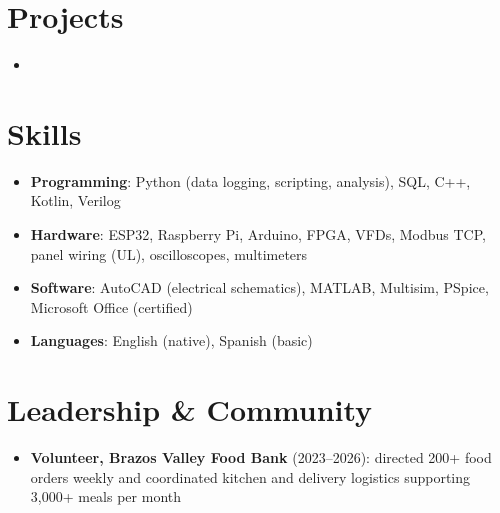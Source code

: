 \documentclass[11pt,letterpaper,sans]{moderncv}
\begin{document}

\section{Projects}
\begin{itemize}
\item{}
\end{itemize}


\section{Skills}
\begin{itemize}
\item \textbf{Programming}: Python (data logging, scripting, analysis), SQL, C++, Kotlin, Verilog
\item \textbf{Hardware}: ESP32, Raspberry Pi, Arduino, FPGA, VFDs, Modbus TCP, panel wiring (UL), oscilloscopes, multimeters
\item \textbf{Software}: AutoCAD (electrical schematics), MATLAB, Multisim, PSpice, Microsoft Office (certified)
\item \textbf{Languages}: English (native), Spanish (basic)
\end{itemize}


\enlargethispage{3\baselineskip}
\section{Leadership \& Community}
\begin{itemize}
\item {\textbf{Volunteer, Brazos Valley Food Bank} (2023--2026): directed 200+ food orders weekly and coordinated kitchen and delivery logistics supporting 3,000+ meals per month}
\end{itemize}
\end{document}
